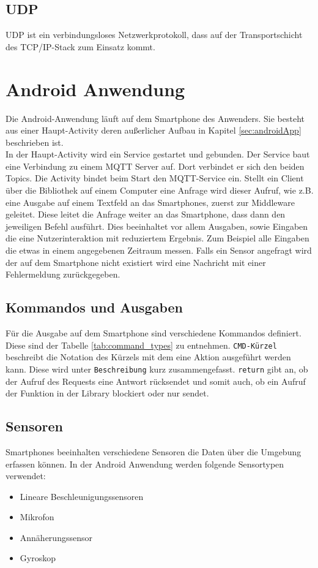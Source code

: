 \documentclass[11pt,a4paper]{report}
\begin{document}
\section{UDP}
UDP ist ein verbindungsloses Netzwerkprotokoll, dass auf der Transportschicht des TCP/IP-Stack zum Einsatz kommt.







\chapter{Android Anwendung}\label{chap:app}
Die Android-Anwendung läuft auf dem Smartphone des Anwenders.
Sie besteht aus einer Haupt-Activity deren außerlicher Aufbau in Kapitel \ref{sec:androidApp} beschrieben ist. 
\\
In der Haupt-Activity wird ein Service gestartet und gebunden.
Der Service baut eine Verbindung zu einem MQTT Server auf.
Dort verbindet er sich den beiden Topics. 
Die Activity bindet beim Start den MQTT-Service ein.
Stellt ein Client über die Bibliothek auf einem Computer eine Anfrage wird dieser Aufruf, wie z.B. eine Ausgabe auf einem Textfeld an das Smartphones,  zuerst zur Middleware geleitet.
Diese leitet die Anfrage weiter an das Smartphone, dass dann den jeweiligen Befehl ausführt.
Dies beeinhaltet vor allem Ausgaben, sowie Eingaben die eine Nutzerinteraktion mit reduziertem Ergebnis.
Zum Beispiel alle Eingaben die etwas in einem angegebenen Zeitraum messen.
Falls ein Sensor angefragt wird der auf dem Smartphone nicht existiert wird eine Nachricht mit einer Fehlermeldung zurückgegeben.


\section{Kommandos und Ausgaben}
Für die Ausgabe auf dem Smartphone sind verschiedene Kommandos definiert.
Diese sind der Tabelle \ref{tab:command_types} zu entnehmen.
\texttt{CMD-Kürzel} beschreibt die Notation des Kürzels mit dem eine Aktion ausgeführt werden kann.
Diese wird unter \texttt{Beschreibung} kurz zusammengefasst.
\texttt{return} gibt an, ob der Aufruf des Requests eine Antwort rücksendet und somit auch, ob ein Aufruf der Funktion in der Library blockiert oder nur sendet.


\section{Sensoren}
Smartphones beeinhalten verschiedene Sensoren die Daten über die Umgebung erfassen können.
In der Android Anwendung werden folgende Sensortypen verwendet:
\begin{itemize}
  \item Lineare Beschleunigungssensoren
  \item Mikrofon
  \item Annäherungssensor
  \item Gyroskop
\end{itemize}
\end{document}
